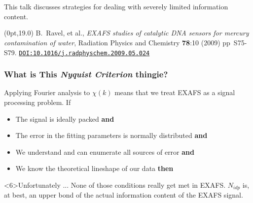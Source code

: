 \documentclass[10pt, xcolor=x11names, compress]{beamer}
\begin{document}
\begin{frame}
  ~\\[-7ex]
  ~

  \begin{exampleblock}{}
    \begin{center}
      This talk discusses strategies for dealing with severely limited
      information content.
    \end{center}
  \end{exampleblock}

  \begin{textblock*}{0.7\linewidth}(0pt,19.0\TPVertModule)%
    \tiny%
    B.\ Ravel, et al., \textit{EXAFS studies of catalytic DNA sensors
      for mercury contamination of water}, Radiation Physics and
    Chemistry \textbf{78}:10 (2009) pp\ S75-S79.
    \href{http://dx.doi.org/10.1016/j.radphyschem.2009.05.024}
    {\color{Blue4}\texttt{DOI:10.1016/j.radphyschem.2009.05.024}}
  \end{textblock*}
\end{frame}

\begin{frame}
  \frametitle{What is This \textit{Nyquist Criterion} thingie?}

  Applying Fourier analysis to $\chi(k)$ means that we treat EXAFS as
  a signal processing problem.  If
  \begin{itemize}
  \item<1-> The signal is ideally packed \alert{\textbf{and}}
  \item<2-> The error in the fitting parameters is normally distributed
    \alert{\textbf{and}}
  \item<3-> We understand and can enumerate all sources of error
    \alert{\textbf{and}}
  \item<4-> We know the theoretical lineshape of our data
    \alert{\textbf{then}}
  \end{itemize}

  \medskip


  \begin{alertblock}<6>{Unfortunately ...}
    None of those conditions really get met in EXAFS.  $N_{idp}$ is,
    at best, an upper bond of the actual information content of the
    EXAFS signal.
  \end{alertblock}
  
\end{frame}
\end{document}
